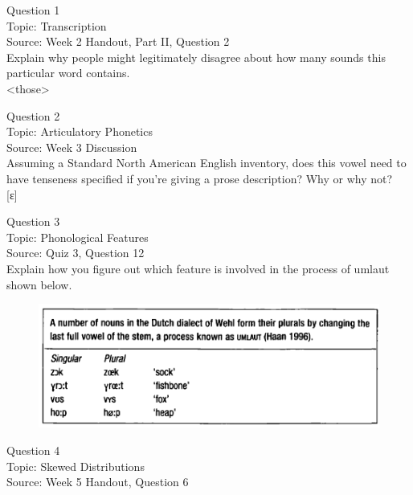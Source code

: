 \documentclass[12pt]{article}
\begin{document}
{\large Question 1}\\

Topic: Transcription\\
Source: Week 2 Handout, Part II, Question 2\\

Explain why people might legitimately disagree about how many sounds this particular word contains.\\

<those>


\newpage

{\large Question 2}\\

Topic: Articulatory Phonetics\\
Source: Week 3 Discussion\\

Assuming a Standard North American English inventory, does this vowel need to have tenseness specified if you're giving a prose description? Why or why not?\\

{[ɛ]}


\newpage

{\large Question 3}\\

Topic: Phonological Features\\
Source: Quiz 3, Question 12\\

Explain how you figure out which feature is involved in the process of umlaut shown below.\\

\begin{figure}[H]
\includegraphics{../images/dutch.png}
\end{figure}

\newpage

{\large Question 4}\\

Topic: Skewed Distributions\\
Source: Week 5 Handout, Question 6\\
\end{document}

